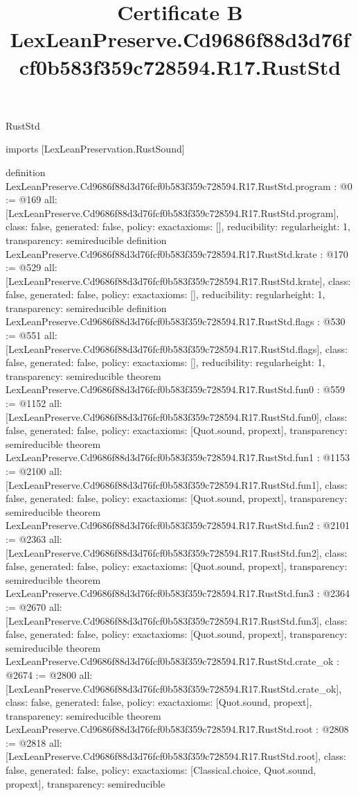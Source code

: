 \begin{lexlean}{RustStd}
\title{Certificate B LexLeanPreserve.Cd9686f88d3d76fcf0b583f359c728594.R17.RustStd}
\begin{coremodule}
imports [LexLeanPreservation.RustSound]

definition LexLeanPreserve.Cd9686f88d3d76fcf0b583f359c728594.R17.RustStd.program : @0 := @169 {
  all: [LexLeanPreserve.Cd9686f88d3d76fcf0b583f359c728594.R17.RustStd.program],
  class: false,
  generated: false,
  policy: exact{axioms: []},
  reducibility: regular{height: 1},
  transparency: semireducible
}
definition LexLeanPreserve.Cd9686f88d3d76fcf0b583f359c728594.R17.RustStd.krate : @170 := @529 {
  all: [LexLeanPreserve.Cd9686f88d3d76fcf0b583f359c728594.R17.RustStd.krate],
  class: false,
  generated: false,
  policy: exact{axioms: []},
  reducibility: regular{height: 1},
  transparency: semireducible
}
definition LexLeanPreserve.Cd9686f88d3d76fcf0b583f359c728594.R17.RustStd.flags : @530 := @551 {
  all: [LexLeanPreserve.Cd9686f88d3d76fcf0b583f359c728594.R17.RustStd.flags],
  class: false,
  generated: false,
  policy: exact{axioms: []},
  reducibility: regular{height: 1},
  transparency: semireducible
}
theorem LexLeanPreserve.Cd9686f88d3d76fcf0b583f359c728594.R17.RustStd.fun0 : @559 := @1152 {
  all: [LexLeanPreserve.Cd9686f88d3d76fcf0b583f359c728594.R17.RustStd.fun0],
  class: false,
  generated: false,
  policy: exact{axioms: [Quot.sound, propext]},
  transparency: semireducible
}
theorem LexLeanPreserve.Cd9686f88d3d76fcf0b583f359c728594.R17.RustStd.fun1 : @1153 := @2100 {
  all: [LexLeanPreserve.Cd9686f88d3d76fcf0b583f359c728594.R17.RustStd.fun1],
  class: false,
  generated: false,
  policy: exact{axioms: [Quot.sound, propext]},
  transparency: semireducible
}
theorem LexLeanPreserve.Cd9686f88d3d76fcf0b583f359c728594.R17.RustStd.fun2 : @2101 := @2363 {
  all: [LexLeanPreserve.Cd9686f88d3d76fcf0b583f359c728594.R17.RustStd.fun2],
  class: false,
  generated: false,
  policy: exact{axioms: [Quot.sound, propext]},
  transparency: semireducible
}
theorem LexLeanPreserve.Cd9686f88d3d76fcf0b583f359c728594.R17.RustStd.fun3 : @2364 := @2670 {
  all: [LexLeanPreserve.Cd9686f88d3d76fcf0b583f359c728594.R17.RustStd.fun3],
  class: false,
  generated: false,
  policy: exact{axioms: [Quot.sound, propext]},
  transparency: semireducible
}
theorem LexLeanPreserve.Cd9686f88d3d76fcf0b583f359c728594.R17.RustStd.crate_ok : @2674 := @2800 {
  all: [LexLeanPreserve.Cd9686f88d3d76fcf0b583f359c728594.R17.RustStd.crate_ok],
  class: false,
  generated: false,
  policy: exact{axioms: [Quot.sound, propext]},
  transparency: semireducible
}
theorem LexLeanPreserve.Cd9686f88d3d76fcf0b583f359c728594.R17.RustStd.root : @2808 := @2818 {
  all: [LexLeanPreserve.Cd9686f88d3d76fcf0b583f359c728594.R17.RustStd.root],
  class: false,
  generated: false,
  policy: exact{axioms: [Classical.choice, Quot.sound, propext]},
  transparency: semireducible
}


\end{coremodule}
\end{lexlean}
